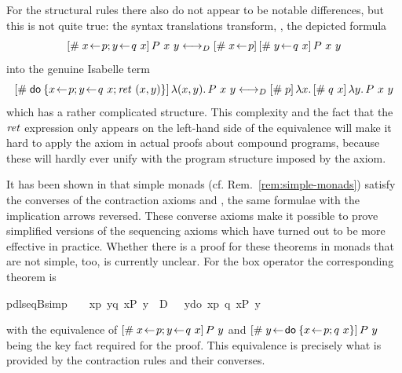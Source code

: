 For the structural rules there also do not appear to be notable differences, but
this is not quite true: the syntax translations transform, \EG, the depicted
formula 
\[ \PDLSBox{x\leteq p; y\leteq q\ x}{P\ x\ y} \longleftrightarrow_D \PDLSBox{x\leteq p}{\PDLSBox{y\leteq
    q\ x}{P\ x\ y}}
\]
into the genuine Isabelle term
\[
\PDLSBox{\DoStmt{x\leteq p; y\leteq q\ x; \ret~(x,y)}}{\LambdaTerm{(x,y)}{P\ x\
    y}} \longleftrightarrow_D \PDLSBox{p}{\LambdaTerm{x}{\PDLSBox{q\ x}{\LambdaTerm{y}{P\ x\ y}}}}
\]
which has a rather complicated structure. This complexity and the fact that the $\mathit{ret}$
expression only appears on the left-hand side of the equivalence will make it
hard to apply the axiom in actual proofs about compound programs, because these
will hardly ever unify with the program structure imposed by the axiom.

It has been shown in \cite{SchroederMossakowski:PDL} that simple monads (cf.
Rem.~\ref{rem:simple-monads}) satisfy the converses of the contraction axioms
\irule{pdl-ctrB} and \irule{pdl-ctrD}, \IE the same formulae with the
implication arrows reversed.  These converse axioms make it possible to prove
simplified versions of the sequencing axioms which have turned out to be more
effective in practice. Whether there is a proof for these theorems in monads
that are not simple, too, is currently unclear. For the box operator the
corresponding theorem is
\begin{isabellebody}
\isanewline
{}\isanewline
pdl{\isacharunderscore}seqB{\isacharunderscore}simp{\isacharcolon}\ {\isachardoublequote}{\isasymturnstile}\ {\isacharparenleft}\ {\isacharbrackleft}{\isacharhash}\ x{\isasymleftarrow}p{\isacharbrackright}{\isacharbrackleft}{\isacharhash}\ y{\isasymleftarrow}q\ x{\isacharbrackright}{\isacharparenleft}P\ y{\isacharparenright}\ {\isacharparenright}\ {\isasymlongleftrightarrow}\isactrlsub D\ {\isacharparenleft}\ {\isacharbrackleft}{\isacharhash}\ y{\isasymleftarrow}do\ {\isacharbraceleft}x{\isasymleftarrow}p{\isacharsemicolon}\ q\ x{\isacharbraceright}{\isacharbrackright}{\isacharparenleft}P\ y{\isacharparenright}\ {\isacharparenright}{\isachardoublequote}\isamarkupfalse%
\isanewline
\end{isabellebody}

\noindent with the equivalence of $[\#\;x\!\gets\! p; y\!\gets\! q\ x]\,{P\ y}$ and
$\PDLSBox{y\leteq \DoStmt{x\leteq p; q\ x}}{P\ y}$ being the key fact required for
the proof. This equivalence is precisely what is provided by the contraction
rules and their converses.


